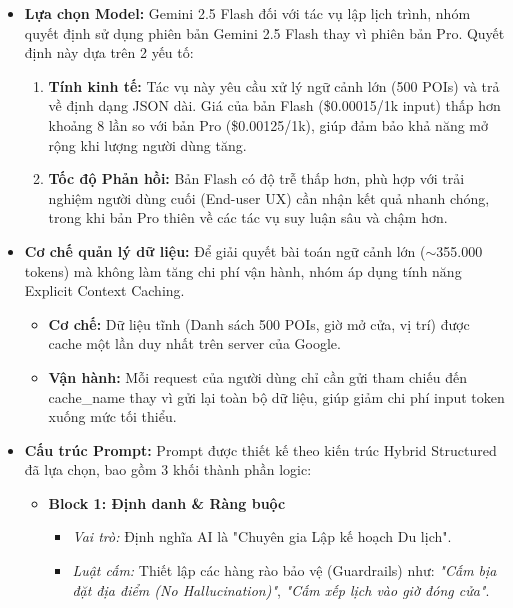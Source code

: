 \begin{itemize}
    \item \textbf{Lựa chọn Model:} Gemini 2.5 Flash đối với tác vụ lập lịch trình, nhóm quyết định sử dụng phiên bản Gemini 2.5 Flash thay vì phiên bản Pro. Quyết định này dựa trên 2 yếu tố:

    \begin{enumerate}[label=\arabic*., leftmargin=*]
        \item \textbf{Tính kinh tế:} Tác vụ này yêu cầu xử lý ngữ cảnh lớn (500 POIs) và trả về định dạng JSON dài. Giá của bản Flash (\$0.00015/1k input) thấp hơn khoảng 8 lần so với bản Pro (\$0.00125/1k), giúp đảm bảo khả năng mở rộng khi lượng người dùng tăng.
        \item \textbf{Tốc độ Phản hồi:} Bản Flash có độ trễ thấp hơn, phù hợp với trải nghiệm người dùng cuối (End-user UX) cần nhận kết quả nhanh chóng, trong khi bản Pro thiên về các tác vụ suy luận sâu và chậm hơn.
    \end{enumerate}

    \item \textbf{Cơ chế quản lý dữ liệu:} Để giải quyết bài toán ngữ cảnh lớn ($\sim$355.000 tokens) mà không làm tăng chi phí vận hành, nhóm áp dụng tính năng Explicit Context Caching.
    \begin{itemize}
        \item \textbf{Cơ chế:} Dữ liệu tĩnh (Danh sách 500 POIs, giờ mở cửa, vị trí) được cache một lần duy nhất trên server của Google.
        \item \textbf{Vận hành:} Mỗi request của người dùng chỉ cần gửi tham chiếu đến cache\_name thay vì gửi lại toàn bộ dữ liệu, giúp giảm chi phí input token xuống mức tối thiểu.
    \end{itemize}

    \item \textbf{Cấu trúc Prompt:} Prompt được thiết kế theo kiến trúc Hybrid Structured đã lựa chọn, bao gồm 3 khối thành phần logic:
    \begin{itemize}
        \item \textbf{Block 1: Định danh \& Ràng buộc}
        \begin{itemize}
            \item \textit{Vai trò:} Định nghĩa AI là "Chuyên gia Lập kế hoạch Du lịch".
            \item \textit{Luật cấm:} Thiết lập các hàng rào bảo vệ (Guardrails) như: \textit{"Cấm bịa đặt địa điểm (No Hallucination)"}, \textit{"Cấm xếp lịch vào giờ đóng cửa"}.
        \end{itemize}
        

\end{itemize}
\end{itemize}
